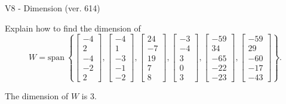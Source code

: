 \begin{exercise}
  \begin{exerciseTitle}V8 - Dimension (ver. 614)\end{exerciseTitle}
  \begin{exerciseStatement}
    Explain how to find the dimension of 
\[W=\mathrm{span}\ \left\{\left[\begin{array}{r}
-4 \\
2 \\
-4 \\
-2 \\
2
\end{array}\right] , \left[\begin{array}{r}
-4 \\
1 \\
-3 \\
-1 \\
-2
\end{array}\right] , \left[\begin{array}{r}
24 \\
-7 \\
19 \\
7 \\
8
\end{array}\right] , \left[\begin{array}{r}
-3 \\
-4 \\
3 \\
0 \\
3
\end{array}\right] , \left[\begin{array}{r}
-59 \\
34 \\
-65 \\
-22 \\
-23
\end{array}\right] , \left[\begin{array}{r}
-59 \\
29 \\
-60 \\
-17 \\
-43
\end{array}\right]\right\}.\]



  \end{exerciseStatement}
  \begin{exerciseAnswer}
   The dimension of \(W\) is  \(3\).
  


  \end{exerciseAnswer}
\end{exercise}